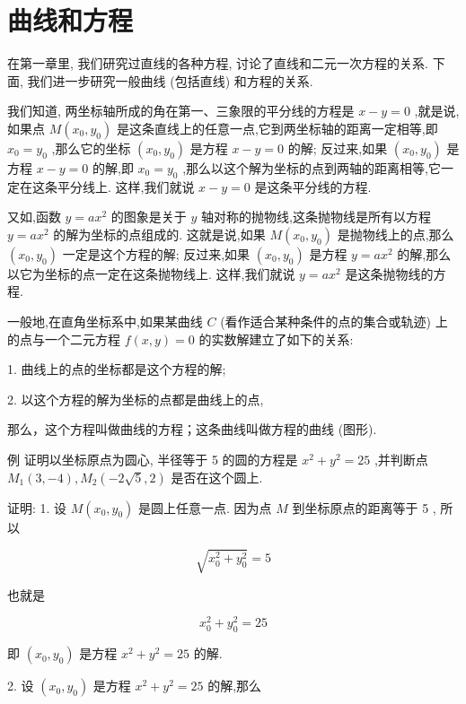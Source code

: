 \documentclass[lang=cn,newtx,10pt,scheme=chinese]{elegantbook}
\begin{document}
\section{曲线和方程}

在第一章里, 我们研究过直线的各种方程, 讨论了直线和二元一次方程的关系. 下面, 我们进一步研究一般曲线 (包括直线) 和方程的关系.

我们知道, 两坐标轴所成的角在第一、三象限的平分线的方程是 \(x - y = 0\) ,就是说,如果点 \(M\left( {{x}_{0},{y}_{0}}\right)\) 是这条直线上的任意一点,它到两坐标轴的距离一定相等,即 \({x}_{0} = {y}_{0}\) ,那么它的坐标 \(\left( {{x}_{0},{y}_{0}}\right)\) 是方程 \(x - y = 0\) 的解; 反过来,如果 \(\left( {{x}_{0},{y}_{0}}\right)\) 是方程 \(x - y = 0\) 的解,即 \({x}_{0} = {y}_{0}\) ,那么以这个解为坐标的点到两轴的距离相等,它一定在这条平分线上. 这样,我们就说 \(x - y = 0\) 是这条平分线的方程.

又如,函数 \(y = a{x}^{2}\) 的图象是关于 \(y\) 轴对称的抛物线,这条抛物线是所有以方程 \(y = a{x}^{2}\) 的解为坐标的点组成的. 这就是说,如果 \(M\left( {{x}_{0},{y}_{0}}\right)\) 是抛物线上的点,那么 \(\left( {{x}_{0},{y}_{0}}\right)\) 一定是这个方程的解; 反过来,如果 \(\left( {{x}_{0},{y}_{0}}\right)\) 是方程 \(y = a{x}^{2}\) 的解,那么以它为坐标的点一定在这条抛物线上. 这样,我们就说 \(y = a{x}^{2}\) 是这条抛物线的方程.

一般地,在直角坐标系中,如果某曲线 \(C\) (看作适合某种条件的点的集合或轨迹) 上的点与一个二元方程 \(f\left( {x,y}\right) = 0\) 的实数解建立了如下的关系:

1. 曲线上的点的坐标都是这个方程的解;

2. 以这个方程的解为坐标的点都是曲线上的点,

那么，这个方程叫做曲线的方程；这条曲线叫做方程的曲线 (图形).

例 证明以坐标原点为圆心, 半径等于 5 的圆的方程是 \({x}^{2} + {y}^{2} = {25}\) ,并判断点 \({M}_{1}\left( {3, - 4}\right) ,{M}_{2}\left( {-2\sqrt{5},2}\right)\) 是否在这个圆上.

证明: 1. 设 \(M\left( {{x}_{0},{y}_{0}}\right)\) 是圆上任意一点. 因为点 \(M\) 到坐标原点的距离等于 5 , 所以

\[
  \sqrt{{x}_{0}^{2} + {y}_{0}^{2}} = 5
\]

也就是

\[
    {x}_{0}^{2} + {y}_{0}^{2} = {25}
\]

即 \(\left( {{x}_{0},{y}_{0}}\right)\) 是方程 \({x}^{2} + {y}^{2} = {25}\) 的解.

2. 设 \(\left( {{x}_{0},{y}_{0}}\right)\) 是方程 \({x}^{2} + {y}^{2} = {25}\) 的解,那么
\end{document}
